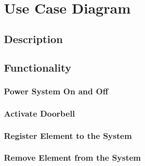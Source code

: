 \chapter{Use Case Diagram}

\section{Description}

\section{Functionality}

\subsection{Power System On and Off}

\subsection{Activate Doorbell}

\subsection{Register Element to the System}

\subsection{Remove Element from the System}